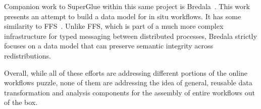 Companion work to SuperGlue within this same project is
Bredala~\cite{dreher:2016:bredala}. This work presents an attempt to build a
data model for in situ workflows. It has some similarity to
FFS~\cite{eisenhauer:2011:ffs}. Unlike FFS, which is part of a much more
complex infrastructure for typed messaging between distributed processes,
Bredala strictly focuses on a data model that can preserve
semantic integrity across redistributions.

Overall, while all of these efforts are addressing different portions of the
online workflows puzzle, none of them are addressing the idea of general,
reusable data transformation and analysis components for the assembly
of entire workflows out of the box.

